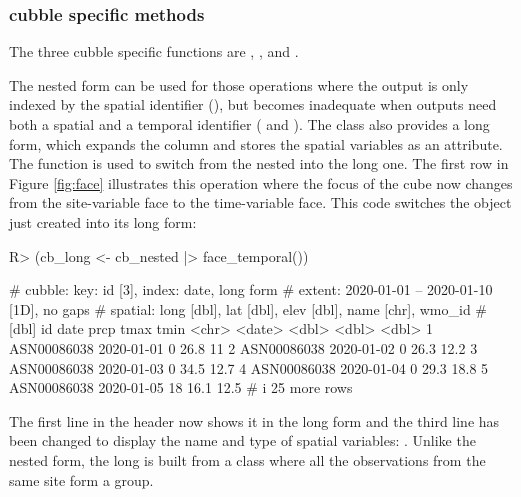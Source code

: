 \documentclass[
  shortnames]{jss}
\begin{document}
\hypertarget{cubble-specific-methods}{%
\subsubsection{cubble specific methods}\label{cubble-specific-methods}}

The three cubble specific functions are , , and .

The nested form can be used for those operations where the output is only indexed by the spatial identifier (), but becomes inadequate when outputs need both a spatial and a temporal identifier ( and ). The  class also provides a long form, which expands the  column and stores the spatial variables as an attribute. The function  is used to switch from the nested  into the long one. The first row in Figure \ref{fig:face} illustrates this operation where the focus of the cube now changes from the site-variable face to the time-variable face. This code switches the  object just created into its long form:

\begin{CodeChunk}
\begin{CodeInput}
R> (cb_long <- cb_nested |> face_temporal())
\end{CodeInput}
\begin{CodeOutput}
# cubble:  key: id [3], index: date, long form
# extent:  2020-01-01 -- 2020-01-10 [1D], no gaps
# spatial: long [dbl], lat [dbl], elev [dbl], name [chr], wmo_id
#   [dbl]
  id          date        prcp  tmax  tmin
  <chr>       <date>     <dbl> <dbl> <dbl>
1 ASN00086038 2020-01-01     0  26.8  11  
2 ASN00086038 2020-01-02     0  26.3  12.2
3 ASN00086038 2020-01-03     0  34.5  12.7
4 ASN00086038 2020-01-04     0  29.3  18.8
5 ASN00086038 2020-01-05    18  16.1  12.5
# i 25 more rows
\end{CodeOutput}
\end{CodeChunk}

The first line in the header now shows it in the long form and the third line has been changed to display the name and type of spatial variables: . Unlike the nested form, the long  is built from a  class where all the observations from the same site form a group.
\end{document}
